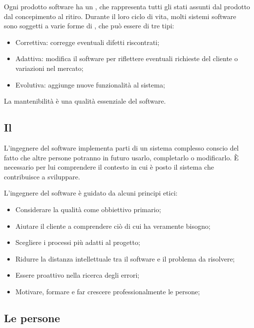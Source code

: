 Ogni prodotto software ha un , che rappresenta tutti gli stati assunti dal prodotto dal concepimento al ritiro. Durante il loro ciclo di vita, molti sistemi software sono soggetti a varie forme di , che può essere di tre tipi: 

\begin{itemize}
	\item Correttiva: corregge eventuali difetti riscontrati;
	\item Adattiva: modifica il software per riflettere eventuali richieste del cliente o variazioni nel mercato;
	\item Evolutiva: aggiunge nuove funzionalità al sistema;
\end{itemize}

La mantenibilità è una qualità essenziale del software.

\subsection{Il }
L'ingegnere del software implementa parti di un sistema complesso conscio del fatto che altre persone potranno in futuro usarlo, completarlo o modificarlo. È necessario per lui comprendere il contesto in cui è posto il sistema che contribuisce a sviluppare.

L'ingegnere del software è guidato da alcuni principi etici:
\begin{itemize}
	\item Considerare la qualità come obbiettivo primario;
	\item Aiutare il cliente a comprendere ciò di cui ha veramente bisogno;
	\item Scegliere i processi più adatti al progetto;
	\item Ridurre la distanza intellettuale tra il software e il problema da risolvere;
	\item Essere proattivo nella ricerca degli errori;
	\item Motivare, formare e far crescere professionalmente le persone;
\end{itemize}


\subsection{Le persone}

